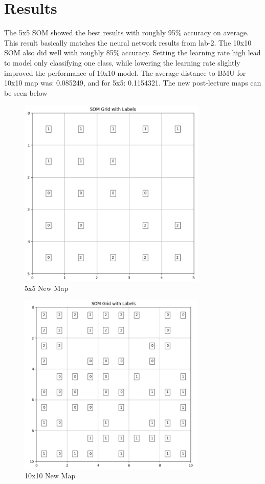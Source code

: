 \documentclass{article}
\begin{document}
\section*{Results}
The 5x5 SOM showed the best results with roughly 95\% accuracy on average. This result basically matches the neural network results from lab-2. The 10x10 SOM also did well with roughly 85\% accuracy. Setting the learning rate high lead to model only classifying one class, while lowering the learning rate slightly improved the performance of 10x10 model. The average distance to BMU for 10x10 map was: 0.085249, and for 5x5: 0.1154321. The new post-lecture maps can be seen below
\begin{figure}[H]
    \centering
    \includegraphics[width=0.8\textwidth]{new-5-5.png}
    \caption{5x5 New Map}
    \label{fig:5-new}
\end{figure}
\begin{figure}[H]
    \centering
    \includegraphics[width=0.8\textwidth]{new-10-10.png}
    \caption{10x10 New Map}
    \label{fig:10-new}
\end{figure}
\end{document}
